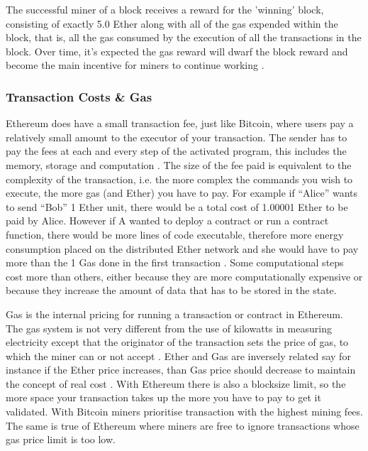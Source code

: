 \documentclass{article}
\begin{document}
The successful miner of a block receives a reward for the 'winning' block, consisting of exactly 5.0 Ether along with all of the gas expended within the block, that is, all the gas consumed by the execution of all the transactions in the block. Over time, it's expected the gas reward will dwarf the block reward and become the main incentive for miners to continue working \citep{57_introduction_ethereum_frontier_guide_2017}.

\cleardoublepage
\subsubsection{Transaction Costs \& Gas}
Ethereum does have a small transaction fee, just like Bitcoin, where users pay a relatively small amount to the executor of your transaction. The sender has to pay the fees at each and every step of the activated program, this includes the memory, storage and computation \citep{54_ethereum_explained_2017}. The size of the fee paid is equivalent to the complexity of the transaction, i.e. the more complex the commands you wish to execute, the more gas (and Ether) you have to pay. For example if ``Alice'' wants to send ``Bob'' 1 Ether unit, there would be a total cost of 1.00001 Ether to be paid by Alice. However if A wanted to deploy a contract or run a contract function, there would be more lines of code executable, therefore more energy consumption placed on the distributed Ether network and she would have to pay more than the 1 Gas done in the first transaction \citep{56_ethereum_2017}. Some computational steps cost more than others, either because they are more computationally expensive or because they increase the amount of data that has to be stored in the state. 

Gas is the internal pricing for running a transaction or contract in Ethereum. The gas system is not very different from the use of kilowatts in measuring electricity except that the originator of the transaction sets the price of gas, to which the miner can or not accept \citep{56_ethereum_2017}. Ether and Gas are inversely related say for instance if the Ether price increases, than Gas price should decrease to maintain the concept of real cost \citep{54_ethereum_explained_2017}. With Ethereum there is also a blocksize limit, so the more space your transaction takes up the more you have to pay to get it validated. With Bitcoin miners prioritise transaction with the highest mining fees. The same is true of Ethereum where miners are free to ignore transactions whose gas price limit is too low. 
\end{document}
